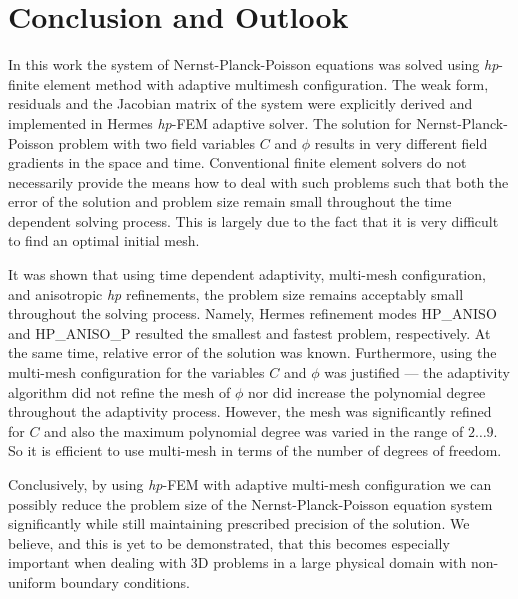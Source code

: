 \section{Conclusion and Outlook}\label{sec:conc}

In this work the system of Nernst-Planck-Poisson equations
was solved using \emph{hp}-finite element method with adaptive
multimesh configuration. The weak form, residuals and
the Jacobian matrix of the system were explicitly derived
and implemented in Hermes \emph{hp}-FEM adaptive solver.
The solution for Nernst-Planck-Poisson
problem with two field variables $C$ and $\phi$ results in 
very different field gradients in the space and time.
Conventional finite element solvers do not necessarily provide the means 
how to deal with such problems such that both the error of
the solution and problem size remain small throughout the
time dependent solving process. This is largely due to the
fact that it is very difficult to find an optimal initial mesh.

It was shown that using time dependent adaptivity, multi-mesh
configuration, and anisotropic \emph{hp} refinements, the problem
size remains acceptably small throughout the solving process.
Namely, Hermes refinement modes HP\_ANISO and HP\_ANISO\_P
resulted the smallest and fastest problem, respectively.
At the same time, relative error of the solution was known.
Furthermore, using the multi-mesh configuration for the variables
$C$ and $\phi$ was justified --- the adaptivity algorithm
did not refine the mesh of $\phi$ nor did increase the
polynomial degree throughout the adaptivity process. However,
the mesh was significantly refined for $C$ and also the
maximum polynomial degree was varied in the range of
$2\ldots 9$. So it is efficient to use multi-mesh in terms of
the number of degrees of freedom.

Conclusively, by using \emph{hp}-FEM with adaptive multi-mesh
configuration we can possibly reduce the problem size
of the Nernst-Planck-Poisson equation system significantly while
still maintaining prescribed precision of the solution. 
We believe, and this
is yet to be demonstrated, that this becomes especially
important when dealing with 3D problems in a large physical
domain with non-uniform boundary conditions.
